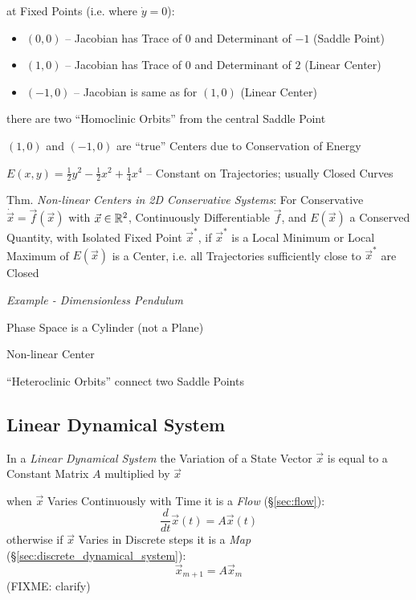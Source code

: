at Fixed Points (i.e. where $\dot{y} = 0$):
\begin{itemize}
  \item $(0,0)$ -- Jacobian has Trace of $0$ and Determinant of $-1$ (Saddle
    Point)
  \item $(1,0)$ -- Jacobian has Trace of $0$ and Determinant of $2$ (Linear
    Center)
  \item $(-1,0)$ -- Jacobian is same as for $(1,0)$ (Linear Center)
\end{itemize}

there are two ``Homoclinic Orbits'' from the central Saddle Point

$(1,0)$ and $(-1,0)$ are ``true'' Centers due to Conservation of Energy

$E(x,y) = \frac{1}{2}y^2 - \frac{1}{2}x^2 + \frac{1}{4}x^4$ -- Constant on
Trajectories; usually Closed Curves


Thm. \emph{Non-linear Centers in 2D Conservative Systems}:
For Conservative $\dot{\vec{x}} = \vec{f}(\vec{x})$ with $\vec{x} \in
\mathbb{R}^2$, Continuously Differentiable $\vec{f}$, and $E(\vec{x})$ a Conserved
Quantity, with Isolated Fixed Point $\vec{x}^*$, if $\vec{x}^*$ is a Local
Minimum or Local Maximum of $E(\vec{x})$ is a Center, i.e. all Trajectories
sufficiently close to $\vec{x}^*$ are Closed


\emph{Example - Dimensionless Pendulum}

Phase Space is a Cylinder (not a Plane)

Non-linear Center

``Heteroclinic Orbits'' connect two Saddle Points



\subsection{Linear Dynamical System}\label{sec:linear_dynamical_system}

In a \emph{Linear Dynamical System} the Variation of a State Vector $\vec{x}$
is equal to a Constant Matrix $A$ multiplied by $\vec{x}$

when $\vec{x}$ Varies Continuously with Time it is a \emph{Flow}
(\S\ref{sec:flow}):
\[
  \frac{d}{dt}\vec{x}(t) = A\vec{x}(t)
\]
otherwise if $\vec{x}$ Varies in Discrete steps it is a \emph{Map}
(\S\ref{sec:discrete_dynamical_system}):
\[
  \vec{x}_{m+1} = A\vec{x}_m
\]
(FIXME: clarify)

